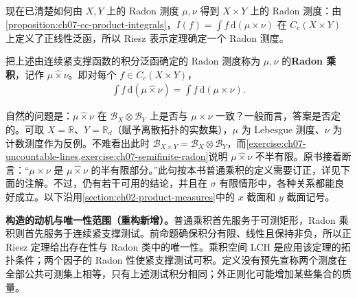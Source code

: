 \documentclass[../../main.tex]{subfiles}
\begin{document}
现在已清楚如何由 $X,Y$ 上的 Radon 测度 $\mu,\nu$ 得到 $X\times Y$ 上的 Radon 测度：由\cref{proposition:ch07-cc-product-integrals}，$I(f)=\int f\,\mathrm d(\mu\times\nu)$ 在 $C_c(X\times Y)$ 上定义了正线性泛函，所以 Riesz 表示定理确定一个 Radon 测度。
\begin{definition}[Radon 乘积]\label{definition:ch07-radon-product}
把上述由连续紧支撑函数的积分泛函确定的 Radon 测度称为 $\mu,\nu$ 的\textbf{Radon 乘积}，记作 $\mu\mathbin{\widehat\times}\nu$。即对每个 $f\in C_c(X\times Y)$，
\begin{align*}
\int f\,\mathrm d(\mu\mathbin{\widehat\times}\nu)=\int f\,\mathrm d(\mu\times\nu).
\end{align*}
\end{definition}
自然的问题是：$\mu\mathbin{\widehat\times}\nu$ 在 $\mathscr B_X\otimes\mathscr B_Y$ 上是否与 $\mu\times\nu$ 一致？一般而言，答案是否定的。可取 $X=\mathbb R$、$Y=\mathbb R_d$（赋予离散拓扑的实数集），$\mu$ 为 Lebesgue 测度、$\nu$ 为计数测度作为反例。不难看出此时 $\mathscr B_{X\times Y}=\mathscr B_X\otimes\mathscr B_Y$，而\cref{exercise:ch07-uncountable-lines,exercise:ch07-semifinite-radon}说明 $\mu\mathbin{\widehat\times}\nu$ 不半有限。原书接着断言：“$\mu\times\nu$ 是 $\mu\mathbin{\widehat\times}\nu$ 的半有限部分。”此句按本书普通乘积的定义需要订正，详见下面的注解。不过，仍有若干可用的结论，并且在 $\sigma$ 有限情形中，各种关系都能良好成立。以下沿用\cref{section:ch02-product-measures}中的 $x$ 截面和 $y$ 截面记号。
\begin{remark}
\textbf{构造的动机与唯一性范围（重构新增）。}普通乘积首先服务于可测矩形，Radon 乘积则首先服务于连续紧支撑测试。前命题确保积分有限、线性且保持非负，所以正 Riesz 定理给出存在性与 Radon 类中的唯一性。乘积空间 LCH 是应用该定理的拓扑条件；两个因子的 Radon 性使紧支撑测试可积。定义没有预先宣称两个测度在全部公共可测集上相等，只有上述测试积分相同；外正则化可能增加某些集合的质量。
\end{remark}
\end{document}
